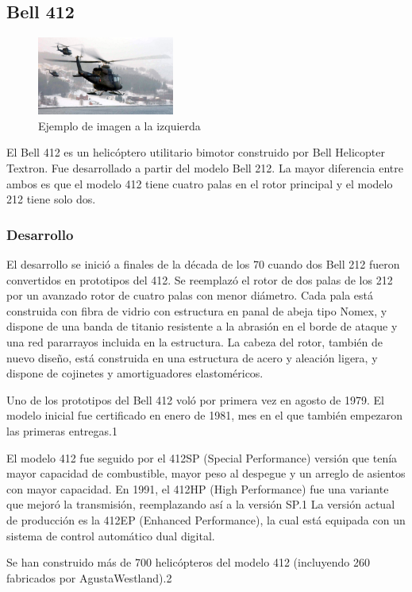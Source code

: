 \subsection{Bell 412}
\begin{figure}
  \begin{center}
    \includegraphics[width=0.40\textwidth]{images/bell.jpg}
  \end{center}
  \caption{Ejemplo de imagen a la izquierda}
\end{figure}
El Bell 412 es un helicóptero utilitario bimotor construido por Bell Helicopter Textron. Fue desarrollado a partir del modelo Bell 212. La mayor diferencia entre ambos es que el modelo 412 tiene cuatro palas en el rotor principal y el modelo 212 tiene solo dos. 
\subsubsection{Desarrollo}
El desarrollo se inició a finales de la década de los 70 cuando dos Bell 212 fueron convertidos en prototipos del 412. Se reemplazó el rotor de dos palas de los 212 por un avanzado rotor de cuatro palas con menor diámetro. Cada pala está construida con fibra de vidrio con estructura en panal de abeja tipo Nomex, y dispone de una banda de titanio resistente a la abrasión en el borde de ataque y una red pararrayos incluida en la estructura. La cabeza del rotor, también de nuevo diseño, está construida en una estructura de acero y aleación ligera, y dispone de cojinetes y amortiguadores elastoméricos.

Uno de los prototipos del Bell 412 voló por primera vez en agosto de 1979. El modelo inicial fue certificado en enero de 1981, mes en el que también empezaron las primeras entregas.1​

El modelo 412 fue seguido por el 412SP (Special Performance) versión que tenía mayor capacidad de combustible, mayor peso al despegue y un arreglo de asientos con mayor capacidad. En 1991, el 412HP (High Performance) fue una variante que mejoró la transmisión, reemplazando así a la versión SP.1​ La versión actual de producción es la 412EP (Enhanced Performance), la cual está equipada con un sistema de control automático dual digital.

Se han construido más de 700 helicópteros del modelo 412 (incluyendo 260 fabricados por AgustaWestland).2​ 
